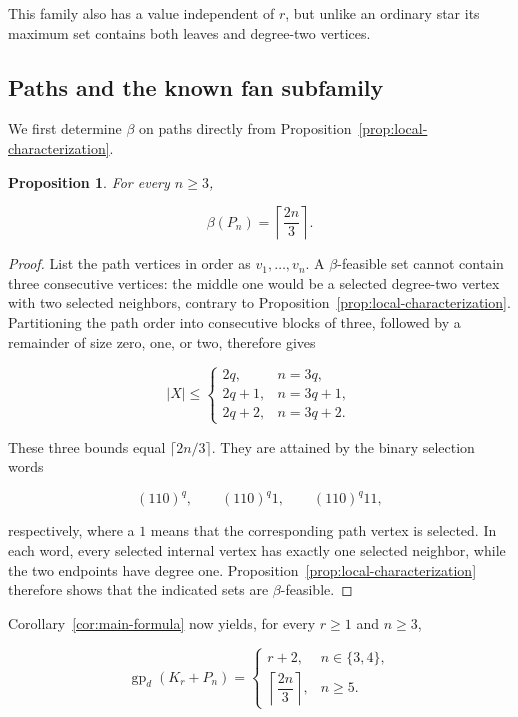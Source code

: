 \documentclass[preprint,12pt]{elsarticle}
\newtheorem{proposition}[theorem]{Proposition}
\numberwithin{equation}{section}
\begin{document}
This family also has a value independent of \(r\), but unlike an
ordinary star its maximum set contains both leaves and degree-two
vertices.

\subsection{Paths and the known fan subfamily}\label{sec:paths}

We first determine \(\beta\) on paths directly from Proposition~\ref{prop:local-characterization}.

\begin{proposition}\label{prop:beta-path}
For every \(n\ge 3\),

\[
\beta(P_n)=\left\lceil\frac{2n}{3}\right\rceil.
\]
\end{proposition}

\begin{proof}
List the path vertices in order as \(v_1,\ldots,v_n\). A
\(\beta\)-feasible set cannot contain three consecutive vertices: the
middle one would be a selected degree-two vertex with two selected
neighbors, contrary to Proposition~\ref{prop:local-characterization}. Partitioning the path order into
consecutive blocks of three, followed by a remainder of size zero, one,
or two, therefore gives

\[
|X|\le
\begin{cases}
2q,&n=3q,\\
2q+1,&n=3q+1,\\
2q+2,&n=3q+2.
\end{cases}
\]

These three bounds equal \(\lceil 2n/3\rceil\). They are attained by the
binary selection words

\[
(110)^q,\qquad (110)^q1,\qquad (110)^q11,
\]

respectively, where a \(1\) means that the corresponding path vertex is
selected. In each word, every selected internal vertex has exactly one
selected neighbor, while the two endpoints have degree one.
Proposition~\ref{prop:local-characterization} therefore shows that the
indicated sets are \(\beta\)-feasible.
\end{proof}

Corollary~\ref{cor:main-formula} now yields, for every \(r\ge 1\) and \(n\ge 3\),

\begin{equation}\label{eq:path-family}
\operatorname{gp}_d(K_r+P_n)=
\begin{cases}
r+2,&n\in\{3,4\},\\
\left\lceil\dfrac{2n}{3}\right\rceil,&n\ge 5.
\end{cases}
\end{equation}
\end{document}
